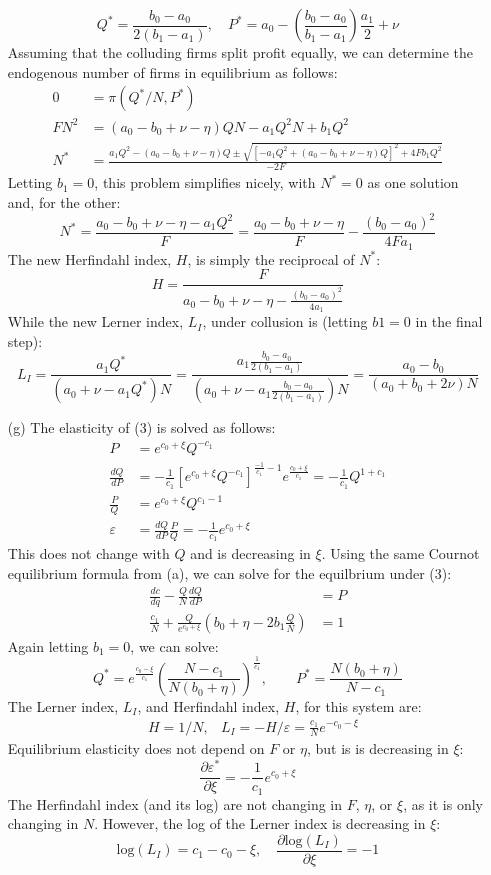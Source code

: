 \documentclass{article}
\newcommand{\loge}[1]{\text{log}\left(#1\right)}
\newcommand{\pl}{\partial}
\begin{document}
\begin{itemize}
\[      Q^* = \frac{b_0-a_0}{2(b_1-a_1)},\quad P^* = a_0 - \left(\frac{b_0-a_0}{b_1-a_1}\right)\frac{a_1}{2} + \nu
    \]
    Assuming that the colluding firms split profit equally, we can determine the endogenous number of firms in equilibrium as follows:\begin{align*}
      0 &= \pi(Q^*/N,P^*)                                    \\
      FN^2 &= (a_0 - b_0 + \nu - \eta)QN - a_1Q^2N + b_1Q^2 \\
      N^* &= \frac{a_1Q^2-(a_0-b_0+\nu-\eta)Q\pm\sqrt{[-a_1Q^2+(a_0-b_0+\nu-\eta)Q]^2+4Fb_1Q^2}}{-2F}
    \end{align*}
    Letting ${b_1=0}$, this problem simplifies nicely, with $N^*=0$ as one solution and, for the other:\[
      N^* = \frac{a_0 - b_0 + \nu - \eta - a_1Q^2}{F} 
          = \frac{a_0 - b_0 + \nu - \eta}{F} - \frac{(b_0-a_0)^2}{4Fa_1}
    \]
    The new Herfindahl index, $H$, is simply the reciprocal of $N^*$:\[
      H = \frac{F}{a_0-b_0+\nu-\eta - \frac{(b_0-a_0)^2}{4a_1}}
    \]
    While the new Lerner index, $L_I$, under collusion is (letting ${b1=0}$ in the final step):\[
      L_I = \frac{a_1Q^*}{(a_0 + \nu - a_1Q^*)N} = \frac{a_1\frac{b_0-a_0}{2(b_1-a_1)}}{\left(a_0 + \nu - a_1\frac{b_0-a_0}{2(b_1-a_1)}\right)N} = \frac{a_0- b_0}{(a_0 + b_0 + 2\nu)N}
    \]
    \item[(g)] The elasticity of (3) is solved as follows: \begin{align*}
      P &= e^{c_0 + \xi}Q^{-c_1}  \\
      \frac{dQ}{dP} &= -\frac{1}{c_1}\left[e^{c_0 + \xi}Q^{-c_1}\right]^{\frac{-1}{c_1}-1}e^{\frac{c_0+\xi}{c_1}} = -\frac{1}{c_1}Q^{1+c_1} \\
      \frac{P}{Q} &= e^{c_0 + \xi}Q^{c_1-1}     \\
      \varepsilon &= \frac{dQ}{dP}\frac{P}{Q} = -\frac{1}{c_1}e^{c_0 + \xi}
    \end{align*}
    This does not change with $Q$ and is decreasing in $\xi$. Using the same Cournot equilibrium formula from (a), we can solve for the equilbrium under (3):\begin{align*}
      \frac{dc}{dq} - \frac{Q}{N}\frac{dQ}{dP} &= P \\
      \frac{c_1}{N} + \frac{Q}{e^{c_0 + \xi}}\left(b_0+\eta-2b_1\frac{Q}{N}\right) &= 1
    \end{align*}
    Again letting ${b_1=0}$, we can solve:\[
      Q^* = e^{\frac{c_0-\xi}{c_1}}\left(\frac{N-c_1}{N(b_0+\eta)}\right)^\frac{1}{c_1}, \quad\quad 
      P^* = \frac{N(b_0+\eta)}{N-c_1}
    \]
    The Lerner index, $L_I$, and Herfindahl index, $H$, for this system are:\begin{align*}
      &H = 1/N, &L_I = -H/\varepsilon = \frac{c_1}{N}e^{-c_0-\xi}
    \end{align*}
    Equilibrium elasticity does not depend on $F$ or $\eta$, but is is decreasing in $\xi$:\[
      \frac{\pl\varepsilon^*}{\pl\xi} = -\frac{1}{c_1}e^{c_0 + \xi}
    \]
    The Herfindahl index (and its log) are not changing in $F$, $\eta$, or $\xi$, as it is only changing in $N$. However, the log of the Lerner index is decreasing in $\xi$:\[
      \loge{L_I} = c_1 - c_0 - \xi,\quad \frac{\pl\loge{L_I}}{\pl\xi} = -1
    \]
\end{itemize}
\pagebreak 
\end{document}
